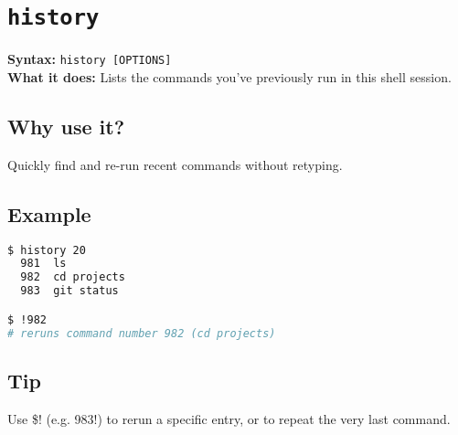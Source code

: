 \documentclass[10pt,oneside]{scrbook}
\begin{document}
\section{\texttt{history}}
\begin{cmdbox}
  \textbf{Syntax:} \lstinline!history [OPTIONS]! \\
  \textbf{What it does:} Lists the commands you’ve previously run in this shell session.
\end{cmdbox}
\begin{commanddetails}
  \subsection*{Why use it?}
    Quickly find and re-run recent commands without retyping.

  \subsection*{Example}
  \begin{lstlisting}[language=bash]
$ history 20
  981  ls
  982  cd projects
  983  git status

$ !982
# reruns command number 982 (cd projects)
  \end{lstlisting}

  \subsection*{Tip}
    Use \lstinline!!\$! (e.g. \lstinline!!983!) to rerun a specific entry, or \lstinline!! to repeat the very last command.
\end{commanddetails}

\end{document}
